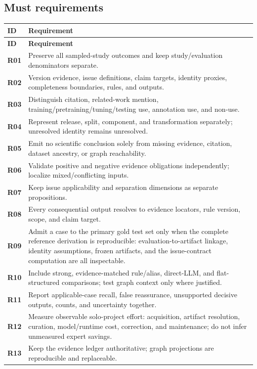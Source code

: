 \documentclass[11pt,a4paper]{article}
\newcommand{\req}[1]{\textsf{\bfseries #1}}
\begin{document}
\subsection{Must requirements}
\begin{longtable}{@{}L{14mm}L{137mm}@{}}
\toprule
\textbf{ID} & \textbf{Requirement}\\ \midrule
\endfirsthead
\toprule\textbf{ID} & \textbf{Requirement}\\ \midrule\endhead
\req{R01} & Preserve all sampled-study outcomes and keep study/evaluation denominators separate.\\
\req{R02} & Version evidence, issue definitions, claim targets, identity proxies, completeness boundaries, rules, and outputs.\\
\req{R03} & Distinguish citation, related-work mention, training/pretraining/tuning/testing use, annotation use, and non-use.\\
\req{R04} & Represent release, split, component, and transformation separately; unresolved identity remains unresolved.\\
\req{R05} & Emit no scientific conclusion solely from missing evidence, citation, dataset ancestry, or graph reachability.\\
\req{R06} & Validate positive and negative evidence obligations independently; localize mixed/conflicting inputs.\\
\req{R07} & Keep issue applicability and separation dimensions as separate propositions.\\
\req{R08} & Every consequential output resolves to evidence locators, rule version, scope, and claim target.\\
\req{R09} & Admit a case to the primary gold test set only when the complete reference derivation is reproducible: evaluation-to-artifact linkage, identity assumptions, frozen artifacts, and the issue-contract computation are all inspectable.\\
\req{R10} & Include strong, evidence-matched rule/alias, direct-LLM, and flat-structured comparisons; test graph context only where justified.\\
\req{R11} & Report applicable-case recall, false reassurance, unsupported decisive outputs, counts, and uncertainty together.\\
\req{R12} & Measure observable solo-project effort: acquisition, artifact resolution, curation, model/runtime cost, correction, and maintenance; do not infer unmeasured expert savings.\\
\req{R13} & Keep the evidence ledger authoritative; graph projections are reproducible and replaceable.\\

\end{longtable}
\end{document}
